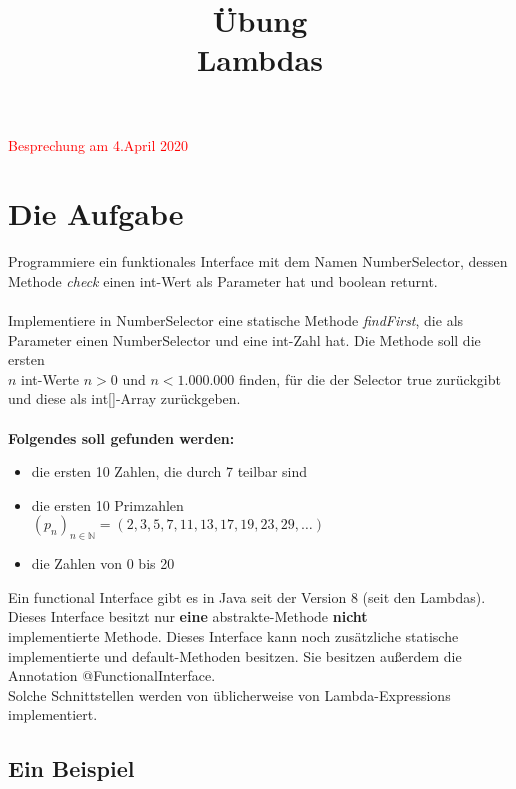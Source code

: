\documentclass[12pt, oneside]{article}
\title{
Übung \\ \vspace{0.3cm}
\Large{Lambdas} 
}
\begin{document}
 \setlength{\parindent}{0em} 
\maketitle
\textcolor{red}{Besprechung am 4.April 2020}
\section{Die Aufgabe}
Programmiere ein funktionales Interface mit dem Namen NumberSelector, dessen Methode \textit{check} einen int-Wert als Parameter hat und boolean returnt. \\ \\
	Implementiere in NumberSelector eine statische Methode \textit{findFirst}, die als \\ Parameter einen NumberSelector und eine int-Zahl hat. Die Methode soll die ersten \\ $n$ int-Werte $n > 0$ und $n < 1.000.000$ finden, für die der Selector true zurückgibt und diese als int[]-Array zurückgeben. \\ \\
	\textbf{Folgendes soll gefunden werden:}
	\begin{itemize}
		\item die ersten 10 Zahlen, die durch 7 teilbar sind
		\item die ersten 10 Primzahlen \\$\left(p_{n}\right)_{n \in \mathbb{N}}=(2,3,5,7,11,13,17,19,23,29,\ldots)$
		\item die Zahlen von 0 bis 20
	\end{itemize}
\vspace{0.5cm}	
\begin{tcolorbox}
		Ein functional Interface gibt es in Java seit der Version 8 (seit den Lambdas).
		Dieses Interface besitzt nur \textbf{eine} abstrakte-Methode \textbf{nicht} \\ implementierte Methode. Dieses Interface kann noch zusätzliche statische \\ implementierte und default-Methoden besitzen. Sie besitzen außerdem die \\ Annotation @FunctionalInterface. \\ Solche Schnittstellen werden von üblicherweise von Lambda-Expressions \\ implementiert.
\end{tcolorbox}

\subsection*{Ein Beispiel}
\end{document}
